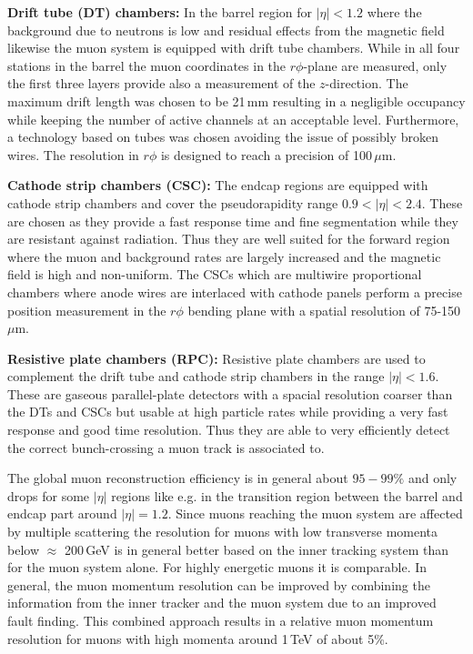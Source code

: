 \begin{description}
 \item \textbf{Drift tube (DT) chambers:} In the barrel region for $|\eta| < 1.2$ where the background due to neutrons is low and residual effects from the magnetic field likewise the muon system is equipped with drift tube chambers. While in all four stations in the barrel the muon coordinates in the $r\phi$-plane are measured, only the first three layers provide also a measurement of the $z$-direction. The maximum drift length was chosen to be 21\,mm resulting in a negligible occupancy while keeping the number of active channels at an acceptable level. Furthermore, a technology based on tubes was chosen avoiding the issue of possibly broken wires. The resolution in $r\phi$ is designed to reach a precision of 100\,$\mu$m.
 \item \textbf{Cathode strip chambers (CSC):} The endcap regions are equipped with cathode strip chambers and cover the pseudorapidity range $0.9 < |\eta| < 2.4$. These are chosen as they provide a fast response time and fine segmentation while they are resistant against radiation. Thus they are well suited for the forward region where the muon and background rates are largely increased and the magnetic field is high and non-uniform. The CSCs which are multiwire proportional chambers where anode wires are interlaced with cathode panels perform a precise position measurement in the $r\phi$ bending plane with a spatial resolution of 75-150\,$\mu$m. 
 \item \textbf{Resistive plate chambers (RPC):} Resistive plate chambers are used to complement the drift tube and cathode strip chambers in the range $|\eta| < 1.6$. These are gaseous parallel-plate detectors with a spacial resolution coarser than the DTs and CSCs but usable at high particle rates while providing a very fast response and good time resolution. Thus they are able to very efficiently detect the correct bunch-crossing a muon track is associated to. 
\end{description}
The global muon reconstruction efficiency is in general about $95-99\%$ and only drops for some $|\eta|$ regions like e.g. in the transition region between the barrel and endcap part around $|\eta|=1.2$. Since muons reaching the muon system are affected by multiple scattering the resolution for muons with low transverse momenta below $\approx$ 200\,GeV is in general better based on the inner tracking system than for the muon system alone. For highly energetic muons it is comparable. In general, the muon momentum resolution can be improved by combining the information from the inner tracker and the muon system due to an improved fault finding. This combined approach results in a relative muon momentum resolution for muons with high momenta around 1\,TeV of about 5\%.

